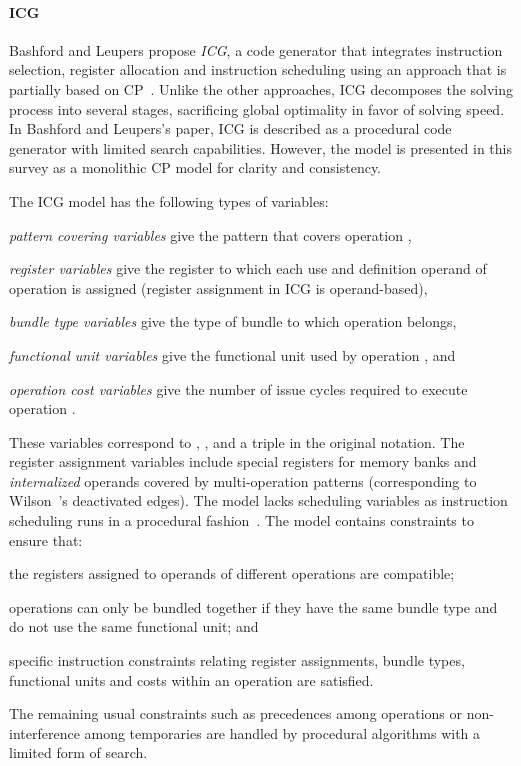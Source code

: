 \documentclass[acmsmall,authorversion,nonacm]{acmart}
\newcommand{\var}[2]{}
\begin{document}
\paragraph{ICG}

Bashford and Leupers propose \emph{ICG}, a code generator that
integrates instruction selection, register allocation and instruction
scheduling using an approach that is partially based on
CP~\cite{Bashford1999}.
Unlike the other approaches, ICG decomposes the solving process into
several stages, sacrificing global optimality in favor of solving
speed.
In Bashford and Leupers's paper, ICG is described as a procedural code
generator with limited search capabilities.
However, the model is presented in this survey as a monolithic CP
model for clarity and consistency.

The ICG model has the following types of variables:
\begin{inparaitem}[]
\item \emph{pattern covering variables} \var{v}{o} give the pattern
  that covers operation ,
\item \emph{register variables} \var{r}{o, op} give the register to
  which each use and definition operand  of operation  is
  assigned (register assignment in ICG is operand-based),
\item \emph{bundle type variables} \var{t}{o} give the type of
  bundle to which operation  belongs,
\item \emph{functional unit variables} \var{f}{o} give the
  functional unit used by operation , and
\item \emph{operation cost variables} \var{c}{o} give the number of
  issue cycles required to execute operation .
\end{inparaitem}
These variables correspond to , , and a triple
 in the original notation.
The register assignment variables include special registers for memory
banks and \emph{internalized} operands covered by multi-operation
patterns (corresponding to Wilson~\etal{}'s deactivated edges).
The model lacks scheduling variables as instruction scheduling runs
in a procedural fashion~\cite[Section 7]{Bashford1999}.
The model contains constraints to ensure that:
\begin{inparaitem}[]
\item the registers assigned to operands of different operations are
  compatible;
\item operations can only be bundled together if they have the same
  bundle type and do not use the same functional unit; and
\item specific instruction constraints relating register assignments,
  bundle types, functional units and costs within an operation are
  satisfied.
\end{inparaitem}
The remaining usual constraints such as precedences among operations
or non-interference among temporaries are handled by procedural
algorithms with a limited form of search.
\end{document}
